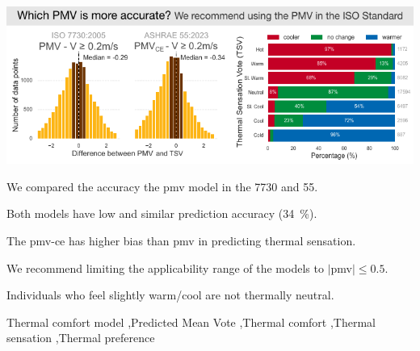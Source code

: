 \begin{frontmatter}
    \begin{graphicalabstract}
        \includegraphics[width=\linewidth]{figures/graphical_abstract}
    \end{graphicalabstract}

    \begin{highlights}
        \item We compared the accuracy the \ac{pmv} model in the \gls{7730} and \gls{55}.
        \item Both models have low and similar prediction accuracy (\qty{34}{\percent}).
        \item The \ac{pmv-ce} has higher bias than \ac{pmv} in predicting thermal sensation.
        \item We recommend limiting the applicability range of the models to $\mid$\ac{pmv}$\mid \leq 0.5$.
        \item Individuals who feel slightly warm/cool are not thermally neutral.
    \end{highlights}

    \begin{keyword}
        Thermal comfort model \sep Predicted Mean Vote \sep Thermal comfort \sep Thermal sensation \sep Thermal preference
    \end{keyword}

\end{frontmatter}
